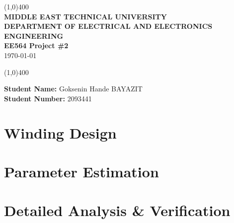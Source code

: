 \documentclass[oneside,12pt]{article}
\begin{document}
\vfill
\begin{titlepage}
\begin{center}
\line(1,0){400}\\
\vspace{2cm}
\LARGE\textbf{MIDDLE EAST TECHNICAL UNIVERSITY}\\
\vspace{0.5cm}
\LARGE\textbf{DEPARTMENT OF ELECTRICAL AND ELECTRONICS ENGINEERING}\\ 

\vspace{1.5cm}
\LARGE\textbf{EE564 Project \#2}\\
\vspace{0.5cm}
\today\\
\vspace{2cm}

\line(1,0){400}\\
\vspace{0.5cm}

\end{center}

\vspace{3cm}
\begin{flushleft}
\LARGE\textbf {Student Name:} Goksenin Hande BAYAZIT\\
\LARGE\textbf {Student Number:} 2093441\\
\end{flushleft}
\end{titlepage}
\newpage
{}

\section{Winding Design}

\section{Parameter Estimation}

\section{Detailed Analysis & Verification}
\end{document}
